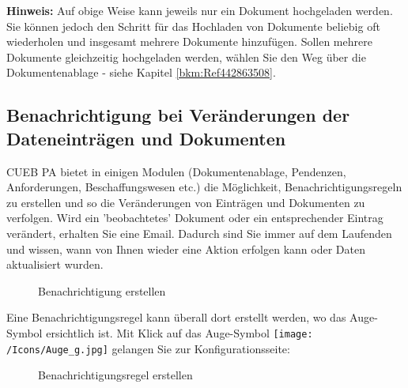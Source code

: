 \vspace{\baselineskip}

\textbf{Hinweis:} Auf obige Weise kann jeweils nur ein Dokument hochgeladen werden. Sie können jedoch den Schritt für das Hochladen von Dokumente beliebig oft wiederholen und insgesamt mehrere Dokumente hinzufügen. Sollen mehrere Dokumente gleichzeitig hochgeladen werden, wählen Sie den Weg über die Dokumentenablage - siehe Kapitel \ref{bkm:Ref442863508}.

\subsection{Benachrichtigung bei Veränderungen der Dateneinträgen und Dokumenten}
\label{bkm:Ref2018080601}

CUEB PA bietet in einigen Modulen (Dokumentenablage, Pendenzen, Anforderungen, Beschaffungswesen etc.) die Möglichkeit, Benachrichtigungsregeln zu erstellen und so die Veränderungen von Einträgen und Dokumenten zu verfolgen. Wird ein 'beobachtetes' Dokument oder ein entsprechender Eintrag verändert, erhalten Sie eine Email. Dadurch sind Sie immer auf dem Laufenden und wissen, wann von Ihnen wieder eine Aktion erfolgen kann oder Daten aktualisiert wurden.

\begin{figure}[H]
\caption{Benachrichtigung erstellen}
\end{figure}

Eine Benachrichtigungsregel kann überall dort erstellt werden, wo das Auge-Symbol ersichtlich ist. Mit Klick auf das Auge-Symbol \texttt{[image: /Icons/Auge\_g.jpg]}  gelangen Sie zur Konfigurationsseite:

\begin{figure}[H]
\caption{Benachrichtigungsregel erstellen}
\end{figure}


